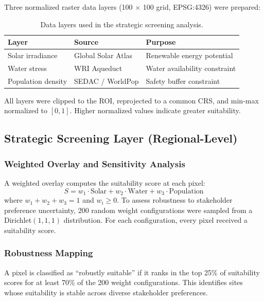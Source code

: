 \documentclass[11pt]{article}
\begin{document}
Three normalized raster data layers (100 $\times$ 100 grid, EPSG:4326) were prepared:

\begin{table}[h]
\centering
\caption{Data layers used in the strategic screening analysis.}
\label{tab:data_layers}
\begin{tabular}{llp{7cm}}
\toprule
Layer & Source & Purpose \\
\midrule
Solar irradiance & Global Solar Atlas & Renewable energy potential \\
Water stress & WRI Aqueduct & Water availability constraint \\
Population density & SEDAC / WorldPop & Safety buffer constraint \\
\bottomrule
\end{tabular}
\end{table}

All layers were clipped to the ROI, reprojected to a common CRS, and min-max normalized to $[0, 1]$. Higher normalized values indicate greater suitability.

\subsection{Strategic Screening Layer (Regional-Level)}

\subsubsection{Weighted Overlay and Sensitivity Analysis}
A weighted overlay computes the suitability score at each pixel:
\begin{equation}
S = w_1 \cdot \text{Solar} + w_2 \cdot \text{Water} + w_3 \cdot \text{Population}
\end{equation}
where $w_1 + w_2 + w_3 = 1$ and $w_i \geq 0$. To assess robustness to stakeholder preference uncertainty, 200 random weight configurations were sampled from a Dirichlet$(1,1,1)$ distribution. For each configuration, every pixel received a suitability score.

\subsubsection{Robustness Mapping}
A pixel is classified as ``robustly suitable'' if it ranks in the top 25\% of suitability scores for at least 70\% of the 200 weight configurations. This identifies sites whose suitability is stable across diverse stakeholder preferences.
\end{document}
